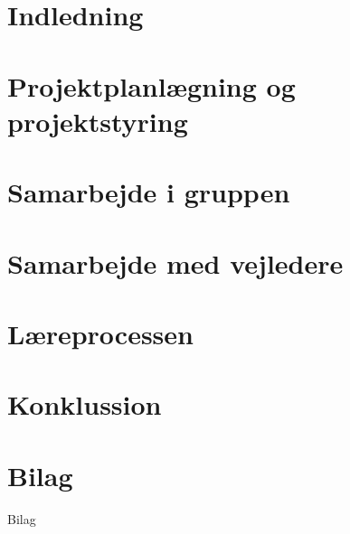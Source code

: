 \documentclass[12pt,a4paper]{report}
\begin{document}
\setcounter{page}{2}

\begin{titlepage}

\thispagestyle{empty}
\end{titlepage}


\tableofcontents
\thispagestyle{empty}

\renewcommand{\chaptername}{Kapitel}

\chapter{Indledning}
\setcounter{page}{3}
	

\chapter{Projektplanlægning og projektstyring}
 
    


\chapter{Samarbejde i gruppen}
 
    


\chapter{Samarbejde med vejledere}
 
    


\chapter{Læreprocessen}
 
    


\chapter{Konklussion}
 
    

\chapter*{Bilag}
 {Bilag}
\end{document}
